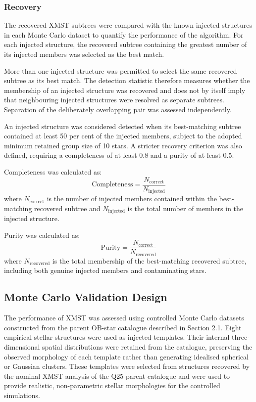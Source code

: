 \documentclass[fleqn,usenatbib]{mnras}
\begin{document}
\subsubsection{Recovery}
The recovered XMST subtrees were compared with the known injected structures in each Monte Carlo dataset to quantify the performance of the algorithm. For each injected structure, the recovered subtree containing the greatest number of its injected members was selected as the best match.

More than one injected structure was permitted to select the same recovered subtree as its best match. The detection statistic therefore measures whether the membership of an injected structure was recovered and does not by itself imply that neighbouring injected structures were resolved as separate subtrees. Separation of the deliberately overlapping pair was assessed independently.

An injected structure was considered detected when its best-matching subtree contained at least 50 per cent of the injected members, subject to the adopted minimum retained group size of 10 stars. A stricter recovery criterion was also defined, requiring a completeness of at least 0.8 and a purity of at least 0.5.

Completeness was calculated as:
\begin{equation}
\mathrm{Completeness} = \frac{N_{\mathrm{correct}}}{N_{\mathrm{injected}}}
\end{equation}
where $N_{\mathrm{correct}}$ is the number of injected members contained within the best-matching recovered subtree and $N_{\mathrm{injected}}$ is the total number of members in the injected structure.

Purity was calculated as:
\begin{equation}
\mathrm{Purity} = \frac{N_{\mathrm{correct}}}{N_{\mathrm{recovered}}}
\end{equation}
where $N_{\mathrm{recovered}}$ is the total membership of the best-matching recovered subtree, including both genuine injected members and contaminating stars.


\subsection{Monte Carlo Validation Design}

The performance of XMST was assessed using controlled Monte Carlo datasets constructed from the parent OB-star catalogue described in Section 2.1. Eight empirical stellar structures were used as injected templates. Their internal three-dimensional spatial distributions were retained from the catalogue, preserving the observed morphology of each template rather than generating idealised spherical or Gaussian clusters. These templates were selected from structures recovered by the nominal XMST analysis of the Q25 parent catalogue and were used to provide realistic, non-parametric stellar morphologies for the controlled simulations.
\end{document}
